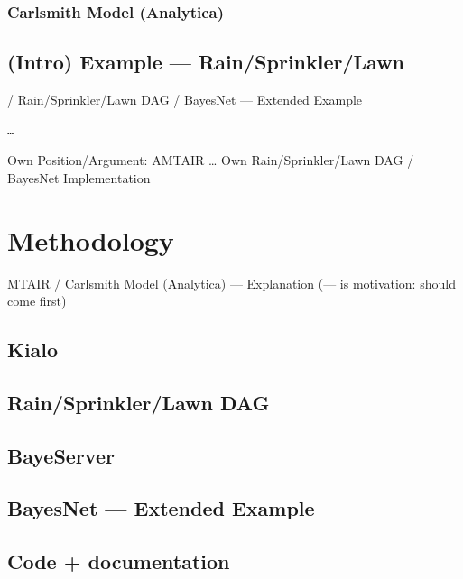 \documentclass[
  letterpaper,
]{book}
\begin{document}
\subsubsection{Carlsmith Model
(Analytica)}\label{carlsmith-model-analytica}

\subsection{(Intro) Example ---
Rain/Sprinkler/Lawn}\label{intro-example-rainsprinklerlawn}

/ Rain/Sprinkler/Lawn DAG / BayesNet --- Extended Example

\begin{verbatim}
…
\end{verbatim}

Own Position/Argument: AMTAIR \ldots{} Own Rain/Sprinkler/Lawn DAG /
BayesNet Implementation

\section{Methodology}\label{methodology}

MTAIR / Carlsmith Model (Analytica) --- Explanation (--- is motivation:
should come first)

\subsection{Kialo}\label{kialo}

\subsection{Rain/Sprinkler/Lawn DAG}\label{rainsprinklerlawn-dag}

\subsection{BayeServer}\label{bayeserver}

\subsection{BayesNet --- Extended
Example}\label{bayesnet-extended-example}

\subsection{Code + documentation}\label{code-documentation}
\end{document}
